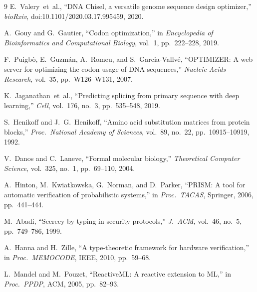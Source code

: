 \documentclass[runningheads]{llncs}
\begin{document}
\begin{thebibliography}{9}
E.~Valery~et~al.,
``DNA Chisel, a versatile genome sequence design optimizer,''
\emph{bioRxiv}, doi:10.1101/2020.03.17.995459, 2020.

A.~Gouy and G.~Gautier,
``Codon optimization,'' in \emph{Encyclopedia of Bioinformatics and Computational Biology}, vol.~1, pp.~222--228, 2019.

F.~Puigb\`{o}, E.~Guzm\'{a}n, A.~Romeu, and S.~Garcia-Vallv\'{e},
``OPTIMIZER: A web server for optimizing the codon usage of DNA sequences,''
\emph{Nucleic Acids Research}, vol.~35, pp.~W126--W131, 2007.

K.~Jaganathan~et~al.,
``Predicting splicing from primary sequence with deep learning,''
\emph{Cell}, vol.~176, no.~3, pp.~535--548, 2019.

S.~Henikoff and J.~G.~Henikoff,
``Amino acid substitution matrices from protein blocks,''
\emph{Proc.\ National Academy of Sciences}, vol.~89, no.~22, pp.~10915--10919, 1992.

V.~Danos and C.~Laneve,
``Formal molecular biology,''
\emph{Theoretical Computer Science}, vol.~325, no.~1, pp.~69--110, 2004.

A.~Hinton, M.~Kwiatkowska, G.~Norman, and D.~Parker,
``PRISM: A tool for automatic verification of probabilistic systems,''
in \emph{Proc.\ TACAS}, Springer, 2006, pp.~441--444.

M.~Abadi,
``Secrecy by typing in security protocols,''
\emph{J.\ ACM}, vol.~46, no.~5, pp.~749--786, 1999.

A.~Hanna and H.~Zille,
``A type-theoretic framework for hardware verification,''
in \emph{Proc.\ MEMOCODE}, IEEE, 2010, pp.~59--68.

L.~Mandel and M.~Pouzet,
``ReactiveML: A reactive extension to ML,''
in \emph{Proc.\ PPDP}, ACM, 2005, pp.~82--93.

\end{thebibliography}
\end{document}
